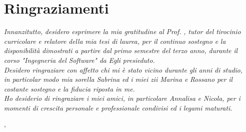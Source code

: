 \cleardoublepage
{}
{}


\bigskip

\begingroup
\let\clearpage\relax
\let\cleardoublepage\relax
\let\cleardoublepage\relax

\chapter*{Ringraziamenti}

\noindent \textit{Innanzitutto, desidero esprimere la mia gratitudine al Prof. \myProf, tutor del tirocinio curricolare e relatore della mia tesi di laurea, per il continuo sostegno e la disponibilità dimostrati a partire dal primo semestre del terzo anno, durante il corso "Ingegneria del Software" da Egli presieduto.}\\

\noindent \textit{Desidero ringraziare con affetto chi mi è stato vicino durante gli anni di studio, in particolar modo mia sorella Sabrina ed i miei zii Marina e Rossano per il costante sostegno e la fiducia riposta in me.}\\

\noindent \textit{Ho desiderio di ringraziare i miei amici, in particolare Annalisa e Nicola, per i momenti di crescita personale e professionale condivisi ed i legami maturati.}\\
\bigskip

\noindent\textit{\myLocation, \myTime}
\hfill \myName

\endgroup
